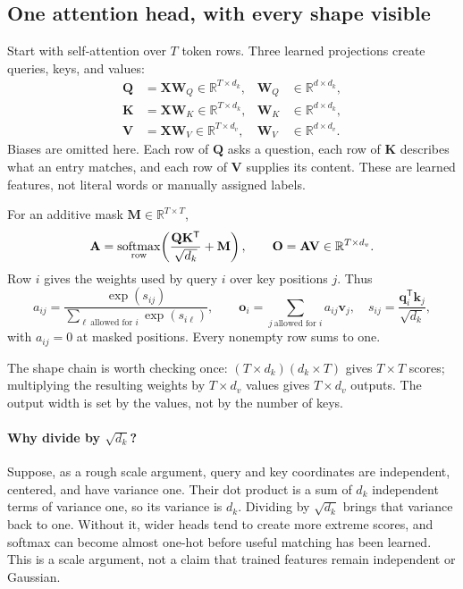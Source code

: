 \documentclass[11pt, oneside]{book}
\newcommand{\R}{\mathbb{R}}
\newcommand{\T}{^{\mathsf{T}}}           %
\DeclareMathOperator{\softmax}{softmax}
\let\originalsubsection\subsection
\renewcommand{\subsection}{\Needspace{6\baselineskip}\originalsubsection}
\begin{document}
\subsection*{One attention head, with every shape visible}
Start with self-attention over $T$ token rows. Three learned projections create queries, keys, and values:
\begin{align*}
 \mathbf{Q}&=\mathbf{X}\mathbf{W}_Q\in\R^{T\times d_k}, &\mathbf{W}_Q&\in\R^{d\times d_k},\\
 \mathbf{K}&=\mathbf{X}\mathbf{W}_K\in\R^{T\times d_k}, &\mathbf{W}_K&\in\R^{d\times d_k},\\
 \mathbf{V}&=\mathbf{X}\mathbf{W}_V\in\R^{T\times d_v}, &\mathbf{W}_V&\in\R^{d\times d_v}.
\end{align*}
Biases are omitted here. Each row of $\mathbf{Q}$ asks a question, each row of $\mathbf{K}$ describes what an entry matches, and each row of $\mathbf{V}$ supplies its content. These are learned features, not literal words or manually assigned labels.

\begin{thmbox}[title={Scaled dot-product attention}]
For an additive mask $\mathbf{M}\in\R^{T\times T}$,
\[
 \mathbf{A}=\softmax_{\rm row}\!\left(\frac{\mathbf{Q}\mathbf{K}\T}{\sqrt{d_k}}+\mathbf{M}\right),
 \qquad \mathbf{O}=\mathbf{A}\mathbf{V}\in\R^{T\times d_v}.
\]
Row $i$ gives the weights used by query $i$ over key positions $j$. Thus
\[
 a_{ij}=\frac{\exp(s_{ij})}{\sum_{\ell\ \text{allowed for }i}\exp(s_{i\ell})},\qquad
 \mathbf{o}_i=\sum_{j\ \text{allowed for }i}a_{ij}\mathbf{v}_j,
 \quad s_{ij}=\frac{\mathbf{q}_i\T\mathbf{k}_j}{\sqrt{d_k}},
\]
with $a_{ij}=0$ at masked positions. Every nonempty row sums to one.
\end{thmbox}

The shape chain is worth checking once: $(T\times d_k)(d_k\times T)$ gives $T\times T$ scores; multiplying the resulting weights by $T\times d_v$ values gives $T\times d_v$ outputs. The output width is set by the values, not by the number of keys.

\paragraph{Why divide by $\sqrt{d_k}$?} Suppose, as a rough scale argument, query and key coordinates are independent, centered, and have variance one. Their dot product is a sum of $d_k$ independent terms of variance one, so its variance is $d_k$. Dividing by $\sqrt{d_k}$ brings that variance back to one. Without it, wider heads tend to create more extreme scores, and softmax can become almost one-hot before useful matching has been learned. This is a scale argument, not a claim that trained features remain independent or Gaussian.
\end{document}
